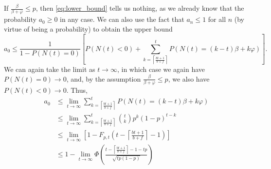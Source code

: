 \documentclass[letterpaper]{article}
\begin{document}
If $\frac{\beta}{\beta +\varphi} \le p$, then \eqref{eq:lower_bound} tells us nothing, as we already know that the probability $a_0 \ge 0$ in any case. We can also use the fact that $a_n \le 1$ for all $n$ (by virtue of being a probability) to obtain the upper bound
\begin{equation*}
	a_0 \le \frac{1}{1-P(N(t){=}0)}\left[P(N(t){<} 0) + \sum_{k=\left\lceil\frac{bt+1}{b+f}\right\rceil}^{t} P(N(t){=}(k-t)\beta + k\varphi)\right].
\end{equation*}
We can again take the limit as $t\to \infty$, in which case we again have $P(N(t){=}0) \to 0$, and, by the assumption $\frac{\beta}{\beta+\varphi} \le p$, we also have $P(N(t){<}0)\to 0$. Thus,
\begin{align*}
	a_0 &\le \lim_{t\to\infty}\sum_{k=\left\lceil\frac{bt+1}{b+f}\right\rceil}^{t} P(N(t){=}(k-t)\beta + k\varphi) \\
	&\le \lim_{t\to\infty}\sum_{k=\left\lceil\frac{bt+1}{b+f}\right\rceil}^{t} \binom{t}{k}p^k(1-p)^{t-k} \\
	&\le \lim_{t\to\infty}\left[1 -F_{p,t}\left(t-\left\lceil\frac{bt+1}{b+f}\right\rceil-1\right)\right] \\[0.5em]
	&\le 1 - \lim_{t\to\infty} \Phi\left(\frac{t - \left\lceil\frac{bt+1}{b+f}\right\rceil - 1 - tp}{\sqrt{tp(1-p)}}\right)
\end{align*}
\end{document}
